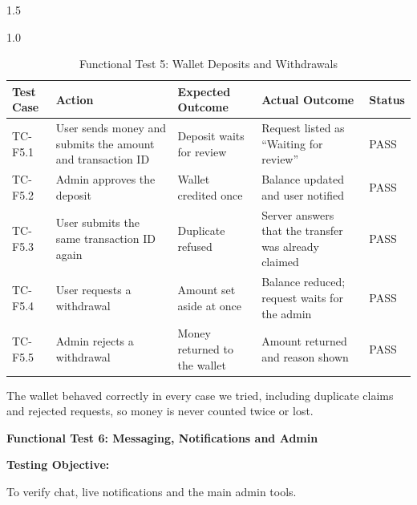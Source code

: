 \documentclass[A4paper,12pt]{report}
\theoremstyle{plain}
\theoremstyle{definition}
\theoremstyle{remark}
\numberwithin{equation}{section}
\begin{document}
\begin{spacing}{1.5}
\begin{table}[H]
\centering
\caption{Functional Test 5: Wallet Deposits and Withdrawals}
\begin{spacing}{1.0}
{\small
\begin{tabular}{|p{}|p{}|p{}|p{}|p{}|}
\hline
\textbf{Test Case} & \textbf{Action} & \textbf{Expected Outcome} & \textbf{Actual Outcome} & \textbf{Status} \\ \hline
TC-F5.1 & User sends money and submits the amount and transaction ID & Deposit waits for review & Request listed as ``Waiting for review'' & PASS \\ \hline
TC-F5.2 & Admin approves the deposit & Wallet credited once & Balance updated and user notified & PASS \\ \hline
TC-F5.3 & User submits the same transaction ID again & Duplicate refused & Server answers that the transfer was already claimed & PASS \\ \hline
TC-F5.4 & User requests a withdrawal & Amount set aside at once & Balance reduced; request waits for the admin & PASS \\ \hline
TC-F5.5 & Admin rejects a withdrawal & Money returned to the wallet & Amount returned and reason shown & PASS \\ \hline
\end{tabular}}
\end{spacing}
\end{table}

The wallet behaved correctly in every case we tried, including duplicate claims and rejected requests, so money is never counted twice or lost.

\textbf{Functional Test 6: Messaging, Notifications and Admin}

\textbf{Testing Objective:}

To verify chat, live notifications and the main admin tools.


\end{spacing}
\end{document}

